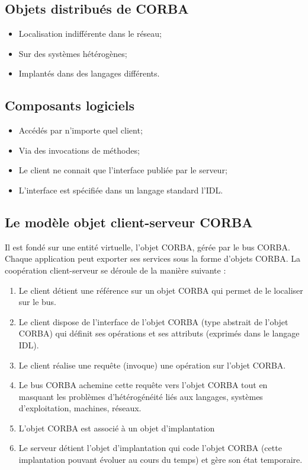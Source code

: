     \subsection{Objets distribués de CORBA}

        \begin{itemize}
            \item  Localisation indifférente dans le réseau;
            \item Sur des systèmes hétérogènes;
            \item Implantés dans des langages différents.
        \end{itemize}

    
    \subsection{Composants logiciels}

        \begin{itemize}
            \item  Accédés par n'importe quel client;
            \item Via des invocations de méthodes;
            \item Le client ne connait que l'interface publiée par le serveur;
            \item L'interface est spécifiée dans un langage standard l'IDL.
        \end{itemize}

    \subsection{Le modèle objet client-serveur CORBA}

    Il est fondé sur une entité virtuelle, l'objet CORBA, gérée par le bus CORBA. Chaque application peut exporter ses services sous la forme d'objets CORBA.
    La coopération client-serveur se déroule de la manière suivante :
    \begin{enumerate}
        \item  Le client détient une référence sur un objet CORBA qui permet de le localiser sur le bus.
        \item Le client dispose de l'interface de l'objet CORBA (type abstrait de l'objet CORBA) qui définit ses opérations et ses attributs (exprimés dans le langage IDL).
        \item Le client réalise une requête (invoque) une opération sur l'objet CORBA.
        \item Le bus CORBA achemine cette requête vers l'objet CORBA tout en masquant les problèmes d'hétérogénéité liés aux langages, systèmes d'exploitation, machines, réseaux.
        \item L'objet CORBA est associé à un objet d'implantation
        \item Le serveur détient l'objet d'implantation qui code l'objet CORBA (cette implantation pouvant évoluer au cours du temps) et gère son état temporaire.
    \end{enumerate}

